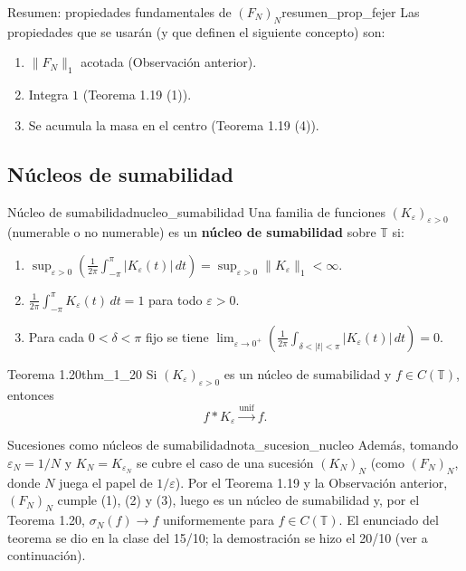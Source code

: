 \begin{nota}{Resumen: propiedades fundamentales de $(F_N)_N$}{resumen_prop_fejer}
Las propiedades que se usarán (y que definen el siguiente concepto) son:
\begin{enumerate}
\item[(1)] $\|F_N\|_1$ acotada (Observación anterior).
\item[(2)] Integra $1$ (Teorema 1.19 (1)).
\item[(3)] Se acumula la masa en el centro (Teorema 1.19 (4)).
\end{enumerate}
\end{nota}

\subsection{Núcleos de sumabilidad}

\begin{definicion}{Núcleo de sumabilidad}{nucleo_sumabilidad}
Una familia de funciones $(K_\varepsilon)_{\varepsilon>0}$ (numerable o no numerable) es un \textbf{núcleo de sumabilidad} sobre $\mathbb{T}$ si:
\begin{enumerate}
\item[(1)] $\displaystyle\sup_{\varepsilon>0}\left( \frac{1}{2\pi}\int_{-\pi}^{\pi}|K_\varepsilon(t)|\,dt \right) = \sup_{\varepsilon>0}\|K_\varepsilon\|_1 < \infty$.
\item[(2)] $\displaystyle\frac{1}{2\pi}\int_{-\pi}^{\pi}K_\varepsilon(t)\,dt = 1$ para todo $\varepsilon > 0$.
\item[(3)] Para cada $0 < \delta < \pi$ fijo se tiene $\displaystyle\lim_{\varepsilon\to 0^+}\left( \frac{1}{2\pi}\int_{\delta<|t|<\pi}|K_\varepsilon(t)|\,dt \right) = 0$.
\end{enumerate}
\end{definicion}

\begin{teorema}{Teorema 1.20}{thm_1_20}
Si $(K_\varepsilon)_{\varepsilon>0}$ es un núcleo de sumabilidad y $f \in C(\mathbb{T})$, entonces
\[
f * K_\varepsilon \xrightarrow{\text{unif}} f.
\]
\end{teorema}

\begin{nota}{Sucesiones como núcleos de sumabilidad}{nota_sucesion_nucleo}
Además, tomando $\varepsilon_N = 1/N$ y $K_N = K_{\varepsilon_N}$ se cubre el caso de una sucesión $(K_N)_N$ (como $(F_N)_N$, donde $N$ juega el papel de $1/\varepsilon$). Por el Teorema 1.19 y la Observación anterior, $(F_N)_N$ cumple (1), (2) y (3), luego es un núcleo de sumabilidad y, por el Teorema 1.20, $\sigma_N(f) \to f$ uniformemente para $f \in C(\mathbb{T})$. El enunciado del teorema se dio en la clase del 15/10; la demostración se hizo el 20/10 (ver a continuación).
\end{nota}

